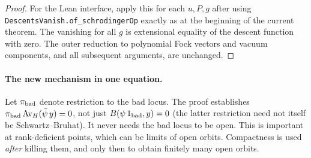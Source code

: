 \documentclass[11pt,letterpaper]{article}
\begin{document}
\begin{proof}
For the Lean interface, apply this for each $u,P,g$ after using \texttt{DescentsVanish.of\_schrodingerOp} exactly as at the beginning of the current theorem. The vanishing for all $g$ is extensional equality of the descent function with zero. The outer reduction to polynomial Fock vectors and vacuum components, and all subsequent arguments, are unchanged.
\end{proof}

\paragraph{The new mechanism in one equation.} Let $\pi_{\rm bad}$ denote restriction to the bad locus. The proof establishes $\pi_{\rm bad}\operatorname{Av}_H(\bar\psi\,y)=0$, not just $B(\psi\,1_{\rm bad},y)=0$ (the latter restriction need not itself be Schwartz--Bruhat). It never needs the bad locus to be open. This is important at rank-deficient points, which can be limits of open orbits. Compactness is used \emph{after} killing them, and only then to obtain finitely many open orbits.
\end{document}
